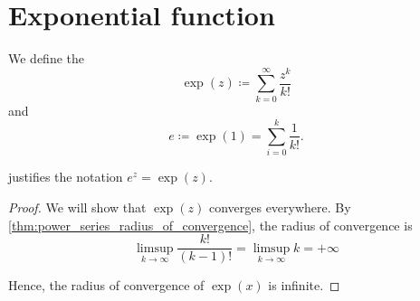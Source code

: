 \section{Exponential function}\label{sec:exponential_function}

\begin{definition}\label{def:exponential_function}
  We define the 
  \begin{equation}\label{def:exponential_function/series}
    \exp(z) \coloneqq \sum_{k=0}^\infty \frac {z^k} {k!}
  \end{equation}
  and 
  \begin{equation*}
    e \coloneqq \exp(1) = \sum_{i=0}^k \frac 1 {k!}.
  \end{equation*}

   justifies the notation \( e^z = \exp(z) \).
\end{definition}
\begin{proof}
  We will show that \( \exp(z) \) converges everywhere. By \cref{thm:power_series_radius_of_convergence}, the radius of convergence is
  \begin{equation*}
    \limsup_{k \to \infty} \frac {k!} {(k-1)!}
    =
    \limsup_{k \to \infty} k
    =
    +\infty
  \end{equation*}

  Hence, the radius of convergence of \( \exp(x) \) is infinite.
\end{proof}

